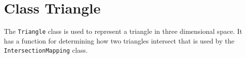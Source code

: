 \documentclass[xcolor=rgb,svgnames,dvipsnames]{article}
\begin{document}




\section{Class Triangle}

The {\tt Triangle} class is used to represent a triangle in three dimensional space.
It has a function for determining how two triangles intersect that is used by the 
{\tt IntersectionMapping} class.


\clearpage



\printindex
\end{document}
